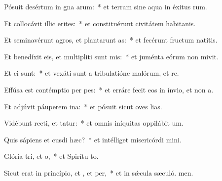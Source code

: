 \item Pósuit desértum in gna arum:~* et terram sine aqua in éxitus rum.
\item Et collocávit illic erites:~* et constituérunt civitátem habitanis.
\item Et seminavérunt agros, et plantarunt as:~* et fecérunt fructum natitis.
\item Et benedíxit eis, et multipliti sunt mis:~* et juménta eórum non mivit.
\item Et ci  sunt:~* et vexáti sunt a tribulatióne malórum, et re.
\item Effúsa est contémptio per pes:~* et erráre fecit eos in ínvio, et non  a.
\item Et adjúvit páuperem  ina:~* et pósuit sicut oves lias.
\item Vidébunt recti, et tatur:~* et omnis iníquitas oppilábit  um.
\item Quis sápiens et cusdi hæc?~* et intélliget misericórdi mini.
\item Glória tri, et o,~* et Spirítu to.
\item Sicut erat in princípio, et , et per,~* et in sǽcula sæculó. men.
